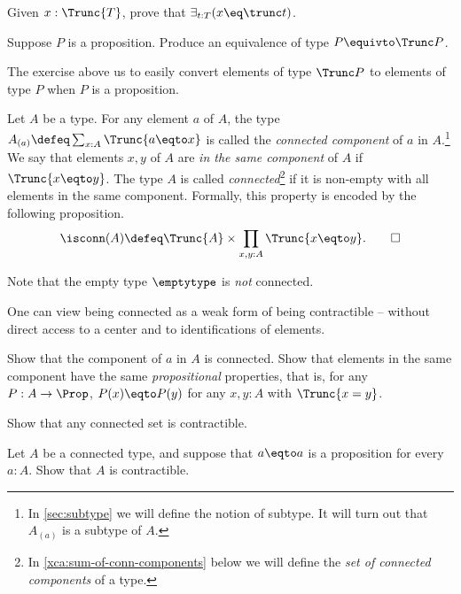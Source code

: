 \begin{xca}
  Given $x:\Trunc{T}$, prove that $\exists_{t:T} ( x \eq \trunc t )$.
\end{xca}

\begin{xca}\label{xca:prop-trivia-1}
  Suppose $P$ is a proposition.  Produce an equivalence of type $P \equivto \Trunc P$.
\end{xca}

The exercise above us to easily convert elements of type $\Trunc P$ to elements of type
$P$ when $P$ is a proposition.

\begin{definition}\label{def:connected}
  Let $A$ be a type. For any element $a$ of $A$, the type
   $A_{(a)}\defeq \sum_{x:A} \Trunc { a \eqto x } $
  is called the \emph{connected component} of $a$ in $A$.\footnote{%
  In \cref{sec:subtype} we will define the notion of subtype.
  It will turn out that $A_{(a)}$ is a subtype of $A$.}
  We say that elements $x,y$ of $A$ are \emph{in the same component}
  of $A$ if $\Trunc { x \eqto y }$. %
  The type $A$ is called \emph{connected}\footnote{%
    In \cref{xca:sum-of-conn-components} below we will
    define the \emph{set of connected components} of a type.}
  if it is non-empty with
  all elements in the same component.  Formally, this property is encoded by the following proposition.
  \[
    \isconn(A) \defeq \Trunc{A} \times \prod_{x,y:A} \Trunc { x \eqto y }.\qedhere
  \]
\end{definition}

Note that the empty type $\emptytype$ is \emph{not} connected.

One can view being connected as a weak form
of being contractible -- without direct access to a center and to
identifications of elements.

\begin{xca}\label{xca:component-connected}
  Show that the component of $a$ in $A$ is connected.
  Show that elements in the same component have the same
  \emph{propositional} properties, that is,
  for any $P:A\to\Prop$, $P(x)\eqto P(y)$
  for any $x,y:A$ with $\Trunc {x=y}$.
\end{xca}

\begin{xca}\label{xca:connected-trivia-2}
  Show that any connected set is contractible.
\end{xca}

\begin{xca}\label{xca:connected-trivia}
Let $A$ be a connected type, and suppose that $a \eqto a$ is a proposition for every $a:A$.
Show that $A$ is contractible.
\end{xca}

